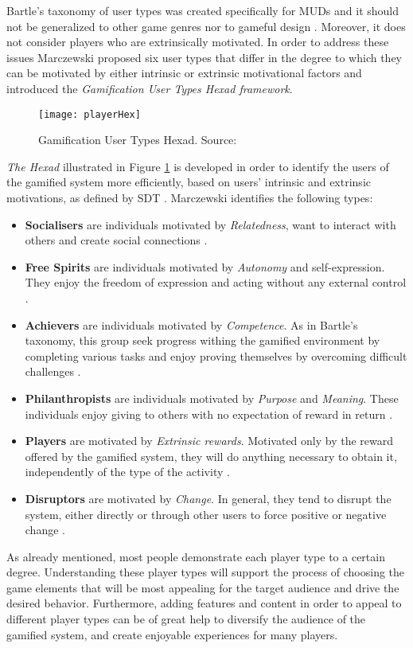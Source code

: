 Bartle's taxonomy of user types was created
specifically for MUDs and it should not be generalized
to other game genres nor to gameful design \cite{tondello2016gamification}. Moreover, it does not consider players who are extrinsically motivated. In order to address these issues Marczewski proposed six user types that differ in the degree to which they can be motivated by either intrinsic or extrinsic  motivational factors \cite{tondello2016gamification} and introduced the \textit{Gamification User Types Hexad framework}.
\begin{figure}[h]
    \centering
    \texttt{[image: playerHex]}
    \caption{Gamification User Types Hexad. Source: \cite{tondello2016gamification}}
    \label{fig:playerHex}
\end{figure}
\textit{The Hexad} illustrated in Figure \ref{fig:playerHex} is developed in order to identify the users of the gamified system more efficiently, based on users' intrinsic and extrinsic motivations, as defined by SDT \cite{tondello2016gamification}. Marczewski identifies the following types:
\begin{itemize}
\item \textbf{Socialisers} are individuals motivated by \textit{Relatedness}, want to interact with others and create social connections \cite{tondello2016gamification}.
\item \textbf{Free Spirits} are individuals  motivated by \textit{Autonomy} and self-expression. They enjoy the freedom of expression and acting without any external control \cite{tondello2016gamification}.   
\item \textbf{Achievers} are individuals  motivated by \textit{Competence}. As in Bartle's taxonomy, this group seek progress withing the gamified environment by completing various tasks and enjoy proving themselves by overcoming difficult challenges \cite{tondello2016gamification}.
\item \textbf{Philanthropists} are individuals motivated by \textit{Purpose} and \textit{Meaning}. These individuals enjoy giving to others with no expectation of reward in return \cite{tondello2016gamification}.
\item \textbf{Players} are motivated by \textit{Extrinsic rewards}. Motivated only by the reward offered by the gamified system, they will do anything necessary to obtain it, independently of the type of the activity \cite{tondello2016gamification}.
\item \textbf{Disruptors} are motivated by \textit{Change}. In general, they tend to disrupt the system, either directly or through other users to force positive or negative change \cite{tondello2016gamification}.
\end{itemize}
As already mentioned, most people demonstrate each player type to a certain degree. Understanding these player types will support 
the process of choosing the game elements that will be most appealing for the target audience and drive the 
desired behavior. Furthermore, adding features and content in order to appeal to different player types can be of great help to diversify the audience of the gamified system, and create enjoyable experiences for many players.

